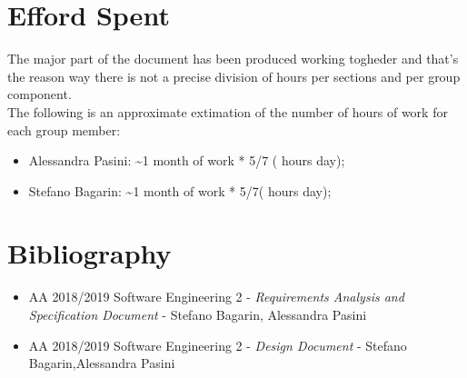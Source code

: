 \section{Efford Spent}
The major part of the document has been produced working togheder and that's the reason way there is not a precise division of hours per sections and per group component.\\
The following is an approximate extimation of the number of hours of work for each group member:
\begin{itemize}
\item Alessandra Pasini: \textasciitilde 1 month of work * 5/7 ( hours day);
\item Stefano Bagarin: \textasciitilde 1 month of work * 5/7( hours day);
\end{itemize}

\section{Bibliography}
\begin{itemize}
	\item AA 2018/2019 Software Engineering 2 - \emph{Requirements Analysis and Specification Document} - Stefano Bagarin, 			Alessandra Pasini
	\item  AA 2018/2019 Software Engineering 2 - \emph{Design Document} - Stefano Bagarin,Alessandra Pasini
\end{itemize}